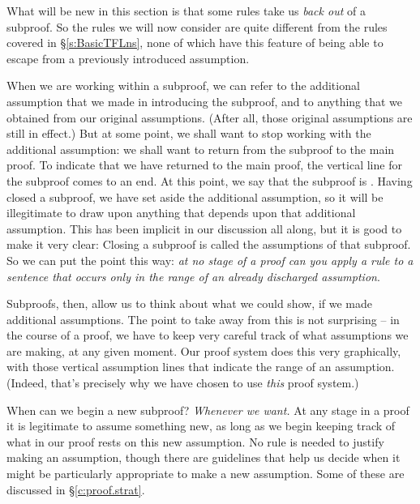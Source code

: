 What will be new in this section is that some rules take us \emph{back out} of a subproof. So the rules we will now consider are quite different from the rules covered in §\ref{s:BasicTFLns}, none of which have this feature of being able to escape from a previously introduced assumption.

When we are working within a subproof, we can refer to the additional assumption that we made in introducing the subproof, and to anything that we obtained from our original assumptions. (After all, those original assumptions are still in effect.) But at some point, we shall want to stop working with the additional assumption: we shall want to return from the subproof to the main proof. To indicate that we have returned to the main proof, the vertical line for the subproof comes to an end. At this point, we say that the subproof is . Having closed a subproof, we have set aside the additional assumption, so it will be illegitimate to draw upon anything that depends upon that additional assumption. This has been implicit in our discussion all along, but it is good to make it very clear:
Closing a subproof is called  the assumptions of that subproof. So we can put the point this way: \emph{at no stage of a proof can you apply a rule to a sentence that occurs only in the range of an already discharged assumption}. 

Subproofs, then, allow us to think about what we could show, if we made additional assumptions. The point to take away from this is not surprising – in the course of a proof, we have to keep very careful track of what assumptions we are making, at any given moment. Our proof system does this very graphically, with those vertical assumption lines that indicate the range of an assumption. (Indeed, that's precisely why we have chosen to use \emph{this} proof system.)

When can we begin a new subproof? \emph{Whenever we want.} At any stage in a proof it is legitimate to assume something new, as long as we begin keeping track of what in our proof rests on this new assumption. No rule is needed to justify making an assumption, though there are guidelines that help us decide when it might be particularly appropriate to make a new assumption. Some of these are discussed in §\ref{c:proof.strat}.

